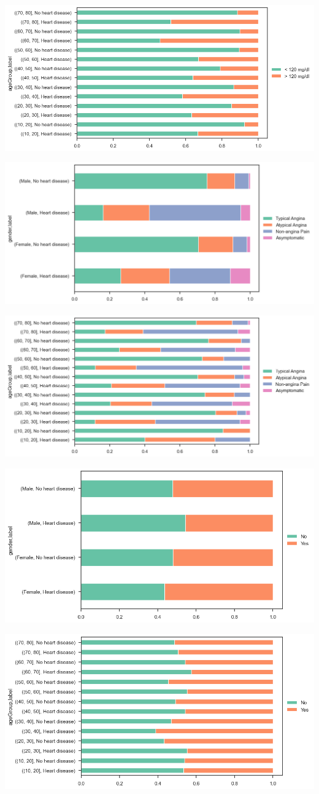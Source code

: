 \includegraphics[width=0.8\linewidth]{media/frequency-08-agegroup-bloodsugar.png}

\includegraphics[width=0.8\linewidth]{media/frequency-09-gender-paintype.png}

\includegraphics[width=0.8\linewidth]{media/frequency-10-agegroup-paintype.png}

\includegraphics[width=0.8\linewidth]{media/frequency-11-gender-exerciseangina.png}

\includegraphics[width=0.8\linewidth]{media/frequency-12-agegroup-exerciseangina.png}

